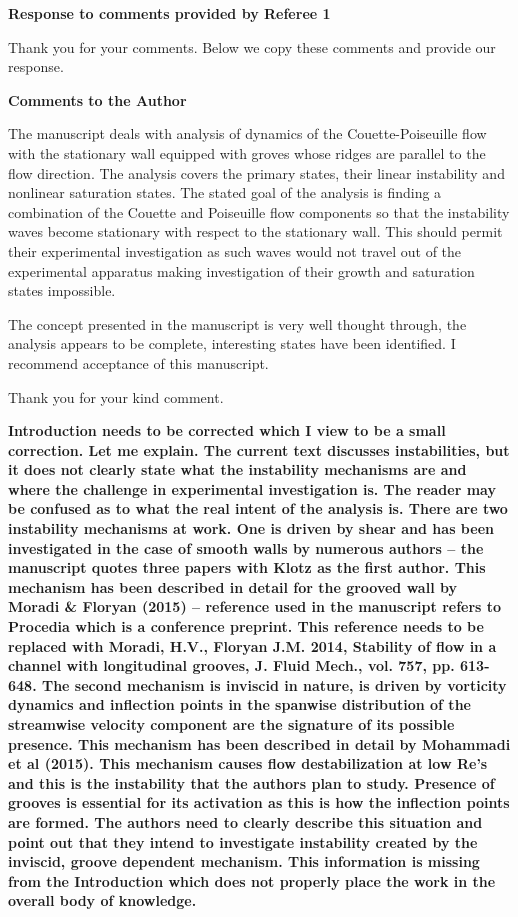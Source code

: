 \documentclass[a4paper,12pt]{article}
\begin{document}
{\bf Response to comments provided by Referee 1}

Thank you for your comments. Below we copy these comments and provide our response. 

\vspace*{50pt}
 

{\bf Comments to the Author 

The manuscript deals with analysis of dynamics of the Couette-Poiseuille flow with the stationary wall equipped with groves whose ridges are parallel to the flow direction. The analysis covers the primary states, their linear instability and nonlinear saturation states. The stated goal of the analysis is finding a combination of the Couette and Poiseuille flow components so that the instability waves become stationary with respect to the stationary wall. This should permit their experimental investigation as such waves would not travel out of the experimental apparatus making investigation of their growth and saturation states impossible. 

The concept presented in the manuscript is very well thought through, the analysis appears to be complete, interesting states have been identified. I recommend acceptance of this manuscript.}

\vspace*{20pt}
Thank you for your kind comment. 
\vspace*{20pt}

{\bf Introduction needs to be corrected which I view to be a small correction. Let me explain. The current text discusses instabilities, but it does not clearly state what the instability mechanisms are and where the challenge in experimental investigation is. The reader may be confused as to what the real intent of the analysis is. There are two instability mechanisms at work. One is driven by shear and has been investigated in the case of smooth walls by numerous authors – the manuscript quotes three papers with Klotz as the first author. This mechanism has been described in detail for the grooved wall by Moradi \& Floryan (2015) – reference used in the manuscript refers to Procedia which is a conference preprint. This reference needs to be replaced with   Moradi, H.V., Floryan J.M. 2014, Stability of flow in a channel with longitudinal grooves, J. Fluid Mech., vol. 757, pp. 613-648. The second mechanism is inviscid in nature, is driven by vorticity dynamics and inflection points in the spanwise distribution of the streamwise velocity component are the signature of its possible presence. This mechanism has been described in detail by Mohammadi et al (2015). This mechanism causes flow destabilization at low Re’s and this is the instability that the authors plan to study. Presence of grooves is essential for its activation as this is how the inflection points are formed. The authors need to clearly describe this situation and point out that they intend to investigate instability created by the inviscid, groove dependent mechanism. This information is missing from the Introduction which does not properly place the work in the overall body of knowledge.} 
\end{document}
